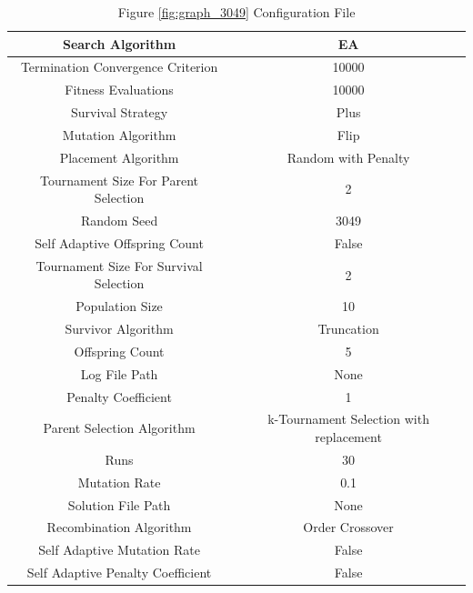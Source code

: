 \documentclass{standalone}
\begin{document}
\begin{table}[!htb]
	\centering
	\caption{Figure \ref{fig:graph_3049} Configuration File}
	\label{tab:graph_3049}
	\begin{tabular}{| c | c |}
		\hline
		Search Algorithm		& EA		 \\
		\hline
		Termination Convergence Criterion		& 10000		 \\
		\hline
		Fitness Evaluations		& 10000		 \\
		\hline
		Survival Strategy		& Plus		 \\
		\hline
		Mutation Algorithm		& Flip		 \\
		\hline
		Placement Algorithm		& Random with Penalty		 \\
		\hline
		Tournament Size For Parent Selection		& 2		 \\
		\hline
		Random Seed		& 3049		 \\
		\hline
		Self Adaptive Offspring Count		& False		 \\
		\hline
		Tournament Size For Survival Selection		& 2		 \\
		\hline
		Population Size		& 10		 \\
		\hline
		Survivor Algorithm		& Truncation		 \\
		\hline
		Offspring Count		& 5		 \\
		\hline
		Log File Path		& None		 \\
		\hline
		Penalty Coefficient		& 1		 \\
		\hline
		Parent Selection Algorithm		& k-Tournament Selection with replacement		 \\
		\hline
		Runs		& 30		 \\
		\hline
		Mutation Rate		& 0.1		 \\
		\hline
		Solution File Path		& None		 \\
		\hline
		Recombination Algorithm		& Order Crossover		 \\
		\hline
		Self Adaptive Mutation Rate		& False		 \\
		\hline
		Self Adaptive Penalty Coefficient		& False		 \\
		\hline
	\end{tabular}
\end{table}
\end{document}
